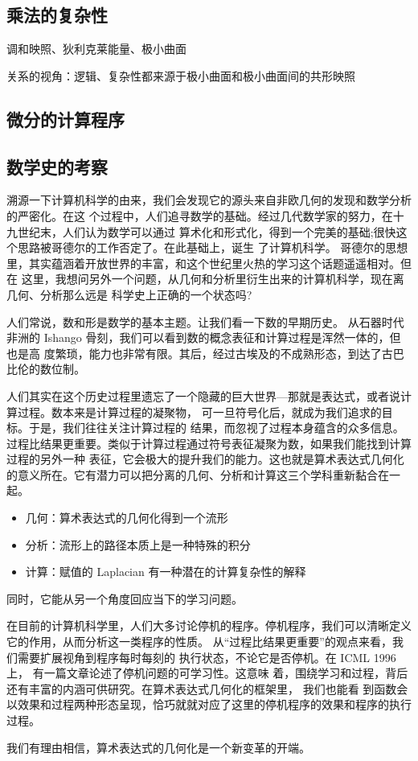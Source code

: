 \documentclass[a4paper,12pt]{article}
\numberwithin{definition}{section}
\numberwithin{lemma}{section}
\numberwithin{proposition}{section}
\numberwithin{theorem}{section}
\numberwithin{grammar}{section}
\numberwithin{program}{section}
\numberwithin{convention}{section}
\numberwithin{corollary}{section}
\begin{document}
\subsection{乘法的复杂性}

调和映照、狄利克莱能量、极小曲面

关系的视角：逻辑、复杂性都来源于极小曲面和极小曲面间的共形映照

\subsection{微分的计算程序}

\subsection{数学史的考察}

溯源一下计算机科学的由来，我们会发现它的源头来自非欧几何的发现和数学分析的严密化。在这
个过程中，人们追寻数学的基础。经过几代数学家的努力，在十九世纪末，人们认为数学可以通过
算术化和形式化，得到一个完美的基础;很快这个思路被哥德尔的工作否定了。在此基础上，诞生
了计算机科学。 哥德尔的思想里，其实蕴涵着开放世界的丰富，和这个世纪里火热的学习这个话题遥遥相对。但在
这里，我想问另外一个问题，从几何和分析里衍生出来的计算机科学，现在离几何、分析那么远是
科学史上正确的一个状态吗?

人们常说，数和形是数学的基本主题。让我们看一下数的早期历史。
从石器时代非洲的 Ishango ⻣刻，我们可以看到数的概念表征和计算过程是浑然一体的，但也是高
度繁琐，能力也非常有限。其后，经过古埃及的不成熟形态，到达了古巴比伦的数位制。

人们其实在这个历史过程里遗忘了一个隐藏的巨大世界—那就是表达式，或者说计算过程。数本来是计算过程的凝聚物，
可一旦符号化后，就成为我们追求的目标。于是，我们往往关注计算过程的 结果，而忽视了过程本身蕴含的众多信息。
过程比结果更重要。类似于计算过程通过符号表征凝聚为数，如果我们能找到计算过程的另外一种
表征，它会极大的提升我们的能力。这也就是算术表达式几何化的意义所在。它有潜力可以把分离的几何、分析和计算这三个学科重新黏合在一起。

\begin{itemize}
    \item 几何：算术表达式的几何化得到一个流形
    \item 分析：流形上的路径本质上是一种特殊的积分
    \item 计算：赋值的 Laplacian 有一种潜在的计算复杂性的解释
\end{itemize}

同时，它能从另一个⻆度回应当下的学习问题。

在目前的计算机科学里，人们大多讨论停机的程序。停机程序，我们可以清晰定义它的作用，从而分析这一类程序的性质。
从“过程比结果更重要”的观点来看，我们需要扩展视⻆到程序每时每刻的 执行状态，不论它是否停机。在 ICML 1996 上，
有一篇文章论述了停机问题的可学习性。这意味 着，围绕学习和过程，背后还有丰富的内涵可供研究。在算术表达式几何化的框架里，
我们也能看 到函数会以效果和过程两种形态呈现，恰巧就就对应了这里的停机程序的效果和程序的执行过程。

我们有理由相信，算术表达式的几何化是一个新变革的开端。

\newpage
{}
{}


\end{document}

